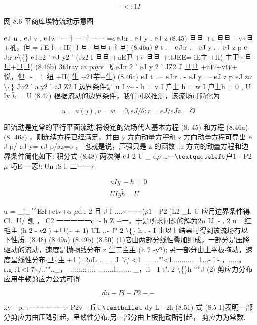\[-<:1 I\]

网 8.6 平商库埃特流动示意图

${\rm e}$J u , ${\rm e}$J v , ${\rm e}$Jw -一十一-十一一 =$\sigma$${\rm e}$J:r . ${\rm e}$J y . ${\rm e}$J z (8.45) 旦旦 +u 旦旦 +v\textasciitilde{}旦+吼，但 =-i E主 +II( 主旦+旦旦+主旦) (8.46a) $\theta$ t . -- ${\rm e}$J:r . - ${\rm e}$J y . - ${\rm e}$J z p ${\rm e}$J:r $\nu$\textbackslash\{\} ${\rm e}$J:r2 ' ${\rm e}$J y2 ' (Jz2 I 旦旦 +uE卫 +v 旦旦 +ttJEE=-iE主 +II( 主卫+旦旦+旦旦) (8.46b) 3t3ray az payv 飞 ${\rm e}$J:r 2 ' ${\rm e}$J y 2 ' JZ2 J 旦旦 +u$\tilde{W}$+v$\tilde{W}$+ 悦，但=- \_!\_纽 +II( 生 +21芋+生) (8.46c) ${\rm e}$J t . -- ${\rm e}$J:r . - ${\rm e}$J y . -- ${\rm e}$J z p ${\rm e}$J z$\nu$\textbackslash\{\} J:r2 ' a y2 ' ${\rm e}$J Z2 I 边界条件是 u I y\textasciitilde{} - h = v I 户士 h = w I 户士h = 0 , U Iy $\tilde{h}$ = U (8.47) 根据流动的边界条件，我们可以推测，该流场可简化为

\[u = u(y) , v = w = 0 , eJ /\theta  :r=eJ/eJ z=O\]

即流动是定常的平行平面流动.将设定的流场代人基本方程 (8. 45) 和方程 (8.46a) (8. 46c) ，则连续方程已经满足，并由 y 方向动量方程和 z 方向动量方程可导出 ${\rm e}$J p/ ${\rm e}$J y= ${\rm e}$J p/az=o ， 也就是说，压强只是 z 的函数 .:r 方向的动量方程和边界条件简化如下: 积分式 (8.48) 两次得 ${\rm e}$J 2 U \_ d$\rho$ …一${\rm ‘}$户1 - P2 $\mu$ 巧E 一忑$\tilde{l}$: Un :S l. 二一一$\tau$-

\begin{gather*}
u Iy ~ -h = 0\\
U Iy\tilde{h} = U
\end{gather*}

u = \_!\_兰Ezf+ctv+$\alpha$ $\mu$d:r 2 且 J I ....\textasciitilde{} 一一($\rho$1 - P2 )L2 \_L U 应用边界条件得: Cl=U/ 凯 ， C2 一一一一一${\rm o}$.:- h Z +一，于是所求问题的解为2$\mu$ IJ .- . 2 u= 红毛主 (h 2 - v2 ) +旦(\textasciitilde{} + 1) UL ,.- J" 2 \textbackslash\{\} h . - I 由以上结果可得到该流场有以下性质. (8.48) (8.49a) (8.49b) (8.50) (1)它由两部分线性叠加组成，一部分是压降驱动的流动，速度是抛物线分布 z 生二主主 (h 2 -y2); 另一部分由上平板拖动，速度呈线性分布$\cdot $旦\{主 +1 ). 2$\mu$L ....... J '7/ <1 ........"'<1..............1...- I -.，.....，r.g-:T<l 7\textasciitilde{}/..""..\_， ..::::.:::::;.-........I........ \_，.I - I t". 2 \textbackslash\{\}h ''''J (2) 剪应力分布 应用牛顿剪应力公式可得

\[du - Pl - P2--\]

xy - p. $\tau$一一一一一:- P2v +丘U${\rm •}$ dy L - 2h (8.51) 式 (8.5 1)表明一部分剪应力由压降引起，呈线性分布;另一部分由上板拖动所引起， 剪应力为常数.

